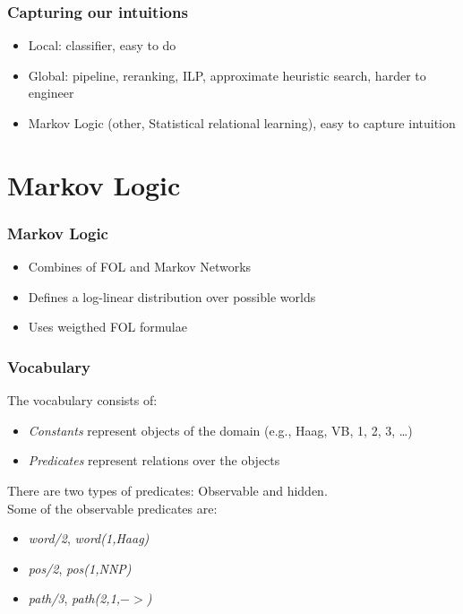 \documentclass{beamer}
\begin{document}
\begin{frame}
    \frametitle{Capturing our intuitions}
    
    \begin{itemize}
        \item Local: classifier, easy to do
        \item Global: pipeline, reranking, ILP, approximate heuristic search, harder to engineer
        \item Markov Logic (other, Statistical relational learning), easy to capture intuition
    \end{itemize}
\end{frame}

\begin{frame}
\tableofcontents
\end{frame}

\section{Markov Logic}

\begin{frame}
 \frametitle{Markov Logic}
 \begin{itemize}
 \item Combines of FOL and Markov Networks
 \item Defines a log-linear distribution over possible worlds
 \item Uses weigthed FOL formulae 
 \end{itemize}
\end{frame}

\begin{frame}
    \frametitle{Vocabulary}
    The vocabulary consists of:
    \begin{itemize}
        \item \emph{Constants} represent objects of the domain (e.g., Haag, VB,
            1, 2, 3, \ldots)
        \item \emph{Predicates} represent relations over the objects
    \end{itemize}
    \bigskip
    There are two types of predicates: Observable and hidden. \\Some of the observable predicates are:
    \begin{itemize}
    \item \emph{word/2}, \emph{word(1,Haag)}
    \item \emph{pos/2},  \emph{pos(1,NNP)}
    \item \emph{path/3}, \emph{path(2,1,$->$)}
    \end{itemize}
    
\end{frame}
\end{document}
